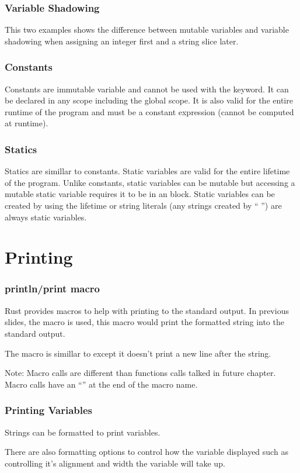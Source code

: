 \documentclass{beamer}
\begin{document}
\begin{frame}
  \frametitle{Variable Shadowing}
  This two examples shows the difference between mutable variables and variable shadowing when assigning an integer first and a string slice later.
  
  
\end{frame}

\begin{frame}
  \frametitle{Constants}
  Constants are immutable variable and cannot be used with the  keyword. It can be declared in any scope including the global scope. It is also valid for the entire runtime of the program and must be a constant expression (cannot be computed at runtime).
  
\end{frame}

\begin{frame}
  \frametitle{Statics}
  Statics are simillar to constants. Static variables are valid for the entire lifetime of the program. Unlike constants, static variables can be mutable but accessing a mutable static variable requires it to be in an  block. Static variables can be created by using the  lifetime or string literals (any strings created by `` '') are always static variables.
  
\end{frame}

\section{Printing}
\begin{frame}
  \frametitle{println/print macro}
  Rust provides macros to help with printing to the standard output. In previous slides, the  macro is used, this macro would print the formatted string into the standard output.
  
  The  macro is simillar to  except it doesn't print a new line after the string.

  \alert{Note:} Macro calls are different than functions calls talked in future chapter. Macro calls have an ``\!'' at the end of the macro name.
\end{frame}

\begin{frame}
  \frametitle{Printing Variables}
  Strings can be formatted to print variables.
  
  There are also formatting options to control how the variable displayed such as controlling it's alignment and width the variable will take up.
  
\end{frame}
\end{document}
